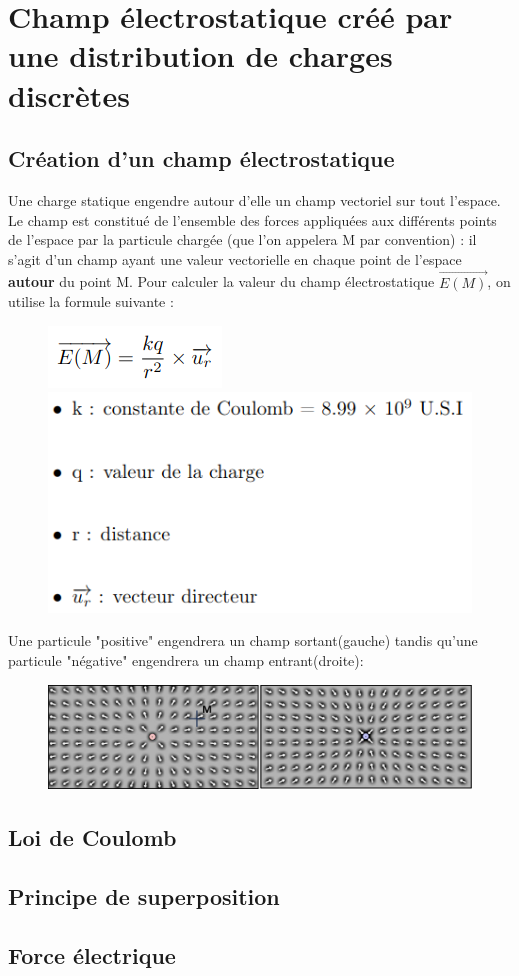 \documentclass{article}
\begin{document}
\newpage
\section{Champ électrostatique créé par une distribution de charges discrètes}
\subsection{Création d'un champ électrostatique}
Une charge statique engendre autour d'elle un champ vectoriel sur tout l'espace. Le champ est constitué de l'ensemble des forces appliquées aux différents points de l'espace par la particule chargée (que l'on appelera M par convention) : il s'agit d'un champ ayant une valeur vectorielle en chaque point de l'espace \textbf{autour} du point M. Pour calculer la valeur du champ électrostatique $\overrightarrow{E(M)}$, on utilise la formule suivante :
\begin{figure}[h]
    \centering
    \includegraphics[scale=0.6]{firstEq.png}
    \includegraphics[scale=0.4]{values_eq1.png}
\end{figure}

Une particule "positive" engendrera un champ sortant(gauche) tandis qu'une particule "négative" engendrera un champ entrant(droite):
\begin{figure}[h]
    \centering
    \includegraphics[scale=0.3]{champ_entrant_sortant.png}
\end{figure}

\subsection{Loi de Coulomb}



\subsection{Principe de superposition}
\subsection{Force électrique}
\end{document}
